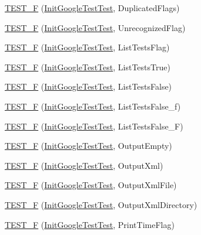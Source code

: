 \begin{DoxyCompactItemize}
\item 
\hyperlink{namespacetesting_a34b640eb46cf4189bed01f18d42d3277}{T\+E\+S\+T\+\_\+F} (\hyperlink{classtesting_1_1_init_google_test_test}{Init\+Google\+Test\+Test}, Duplicated\+Flags)
\item 
\hyperlink{namespacetesting_a1572c861f65ca8d5dfb61246a32a2799}{T\+E\+S\+T\+\_\+F} (\hyperlink{classtesting_1_1_init_google_test_test}{Init\+Google\+Test\+Test}, Unrecognized\+Flag)
\item 
\hyperlink{namespacetesting_a1d111e67e0c6411085ff6d0911f50d18}{T\+E\+S\+T\+\_\+F} (\hyperlink{classtesting_1_1_init_google_test_test}{Init\+Google\+Test\+Test}, List\+Tests\+Flag)
\item 
\hyperlink{namespacetesting_a000181c6b1ac347a3d7797324808ea8d}{T\+E\+S\+T\+\_\+F} (\hyperlink{classtesting_1_1_init_google_test_test}{Init\+Google\+Test\+Test}, List\+Tests\+True)
\item 
\hyperlink{namespacetesting_acc2334b947370b550b7d6241e0d34124}{T\+E\+S\+T\+\_\+F} (\hyperlink{classtesting_1_1_init_google_test_test}{Init\+Google\+Test\+Test}, List\+Tests\+False)
\item 
\hyperlink{namespacetesting_a60e2b7e1cf88c2af6e04055b3afe7cbe}{T\+E\+S\+T\+\_\+F} (\hyperlink{classtesting_1_1_init_google_test_test}{Init\+Google\+Test\+Test}, List\+Tests\+False\+\_\+f)
\item 
\hyperlink{namespacetesting_a4933b012108ecb88243c2dbc13d7665b}{T\+E\+S\+T\+\_\+F} (\hyperlink{classtesting_1_1_init_google_test_test}{Init\+Google\+Test\+Test}, List\+Tests\+False\+\_\+F)
\item 
\hyperlink{namespacetesting_a121894d4edf72b1dbabdcde2bebd745d}{T\+E\+S\+T\+\_\+F} (\hyperlink{classtesting_1_1_init_google_test_test}{Init\+Google\+Test\+Test}, Output\+Empty)
\item 
\hyperlink{namespacetesting_a90df70c45f67d4c0dbc5bd29f7be3361}{T\+E\+S\+T\+\_\+F} (\hyperlink{classtesting_1_1_init_google_test_test}{Init\+Google\+Test\+Test}, Output\+Xml)
\item 
\hyperlink{namespacetesting_a810f99da1185404f8a899c919ee6433e}{T\+E\+S\+T\+\_\+F} (\hyperlink{classtesting_1_1_init_google_test_test}{Init\+Google\+Test\+Test}, Output\+Xml\+File)
\item 
\hyperlink{namespacetesting_ac351c3065ee89f7eb2fbba809db5c61d}{T\+E\+S\+T\+\_\+F} (\hyperlink{classtesting_1_1_init_google_test_test}{Init\+Google\+Test\+Test}, Output\+Xml\+Directory)
\item 
\hyperlink{namespacetesting_aa832ff8ffe6b687c7025cbc766973e0b}{T\+E\+S\+T\+\_\+F} (\hyperlink{classtesting_1_1_init_google_test_test}{Init\+Google\+Test\+Test}, Print\+Time\+Flag)

\end{DoxyCompactItemize}
